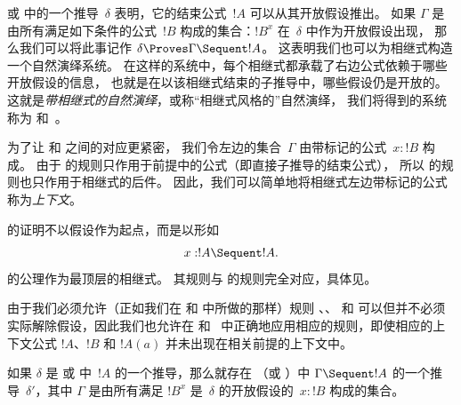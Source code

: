 \documentclass[../../../include/open-logic-section]{subfiles}
\begin{document}


 或  中的一个推导~$\delta$ 表明，它的结束公式~$!A$ 可以从其开放假设推出。
如果 $\Gamma$ 是由所有满足如下条件的公式~$!B$ 构成的集合：$!B^x$ 在~$\delta$ 中作为开放假设出现，
那么我们可以将此事记作 $\delta \Proves \Gamma \Sequent !A$。
这表明我们也可以为相继式构造一个自然演绎系统。
在这样的系统中，每个相继式都承载了右边公式依赖于哪些开放假设的信息，
也就是在以该相继式结束的子推导中，哪些假设仍是开放的。
这就是\emph{带相继式的自然演绎}，或称“相继式风格的”自然演绎，
我们将得到的系统称为  和~。

为了让  和  之间的对应更紧密，
我们令左边的集合~$\Gamma$ 由带标记的公式~$x:!B$ 构成。
由于  的规则只作用于前提中的公式（即直接子推导的结束公式），
所以  的规则也只作用于相继式的后件。
因此，我们可以简单地将相继式左边带标记的公式称为\emph{上下文}。

 的证明不以假设作为起点，而是以形如
\[x:!A \Sequent !A.\]
的公理作为最顶层的相继式。
其规则与  的规则完全对应，具体见。



由于我们必须允许（正如我们在  和  中所做的那样）规则 \Intro{\lif}、\Intro{\lnot}、\Elim{\lor} 和 \Elim{\lexists} 可以但并不必须实际解除假设，因此我们也允许在  和~ 中正确地应用相应的规则，即使相应的上下文公式 $!A$、$!B$ 和 $!A(a)$ 并未出现在相关前提的上下文中。

\begin{prop}
如果 $\delta$ 是  或  中~$!A$ 的一个推导，那么就存在 （或 ）中 $\Gamma \Sequent !A$ 的一个推导~$\delta'$，其中 $\Gamma$ 是由所有满足 $!B^x$ 是~$\delta$ 的开放假设的~$x:!B$ 构成的集合。
\end{prop}
\end{document}
